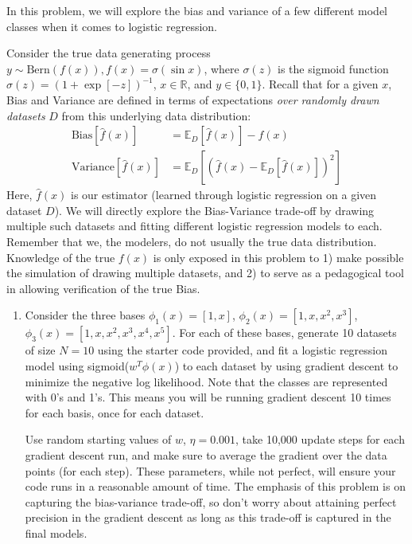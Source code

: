 \documentclass[submit]{harvardml}
\begin{document}
\begin{problem}
  In this problem, we will explore the bias and variance of a
  few different model classes when it comes to logistic regression.

  Consider the true data generating process $y \sim \text{Bern}(f(x)), f(x) = \sigma(\sin x)$, where $\sigma(z)$ is the sigmoid function
  $\sigma(z)= (1+\exp[-z])^{-1}$, $x \in \mathbb{R}$, and $y \in \{0,1\}$.
  Recall that for a given $x$, Bias and Variance are defined in terms of expectations \textit{over randomly drawn datasets} $D$
  from this underlying data distribution:
  \begin{align*}
  \text{Bias}[\hat{f}(x)] &= \mathbb{E}_D[\hat{f}(x)] - f(x)\\
  \text{Variance}[\hat{f}(x)] &= \mathbb{E}_D[(\hat{f}(x) - \mathbb{E}_D[\hat{f}(x)])^2]
  \end{align*}
  Here, $\hat{f}(x)$ is our estimator (learned through logistic regression on a given dataset $D$).
  We will directly explore the Bias-Variance trade-off by drawing multiple such datasets and fitting different logistic regression models to each.
  Remember that we, the modelers, do not usually the true data distribution.
  Knowledge of the true $f(x)$ is only exposed in this problem to 1) make possible the simulation
  of drawing multiple datasets, and 2) to serve as a pedagogical tool in allowing
  verification of the true Bias.

\begin{enumerate}

\item Consider the three bases $\phi_1(x) = [1, x]$,
  $\phi_2(x) = [1, x, x^2, x^3]$, $\phi_3(x) = [1, x, x^2, x^3, x^4, x^5]$.
  For each of these bases, generate 10 datasets of size $N = 10$ using the starter code provided, and fit a logistic regression model using sigmoid($w^T \phi(x)$) to each dataset by using
  gradient descent to minimize the negative log likelihood. Note that the classes are represented with 0's and 1's.
  This means you will be running gradient descent 10 times for each basis, once for each dataset.

  Use random starting values of $w$, $\eta=0.001$, take 10,000 update steps
   for each gradient descent run, and make sure to average the gradient over the data points
   (for each step). These parameters, while not perfect, will ensure your code
   runs in a reasonable amount of time. The emphasis of this problem is on
   capturing the bias-variance trade-off, so don't worry about attaining perfect precision in the gradient descent
   as long as this trade-off is captured in the final models.


\end{enumerate}
\end{problem}
\end{document}
